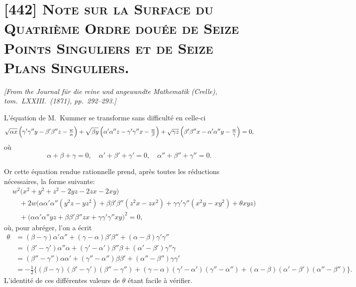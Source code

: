 \documentclass[11pt,a4paper]{article}
\begin{document}
\section{[442] \textsc{Note sur la Surface du Quatri\`eme Ordre dou\'ee de Seize Points Singuliers et de Seize Plans Singuliers.}}

\begin{center}
\textit{[From the Journal f\"ur die reine und angewandte Mathematik (Crelle), tom.\ LXXIII.\ (1871), pp.\ 292--293.]}
\end{center}

\medskip

L'\'equation de M.\ Kummer se transforme sans difficult\'e en celle-ci
\[
\sqrt{\alpha x}\,\Bigl(\gamma'\gamma''y - \beta'\beta''z - \tfrac{w}{\alpha}\Bigr)
+ \sqrt{\beta y}\,\Bigl(\alpha'\alpha''z - \gamma'\gamma''x - \tfrac{w}{\beta}\Bigr)
+ \sqrt{\gamma z}\,\Bigl(\beta'\beta''x - \alpha'\alpha''y - \tfrac{w}{\gamma}\Bigr) = 0,
\]
o\`u
\[
\alpha + \beta + \gamma = 0,\quad \alpha' + \beta' + \gamma' = 0,\quad \alpha'' + \beta'' + \gamma'' = 0.
\]

Or cette \'equation rendue rationnelle prend, apr\`es toutes les r\'eductions n\'ecessaires,
la forme suivante:
\[
\begin{aligned}
& w^2 \bigl(x^2 + y^2 + z^2 - 2yz - 2zx - 2xy\bigr) \\
& \quad + 2w\bigl(\alpha\alpha'\alpha''(y^2 z - y z^2) + \beta\beta'\beta''(z^2 x - z x^2)
   + \gamma\gamma'\gamma''(x^2 y - x y^2) + \theta xyz\bigr) \\
& \quad + \bigl(\alpha\alpha'\alpha''yz + \beta\beta'\beta''zx + \gamma\gamma'\gamma''xy\bigr)^2 = 0,
\end{aligned}
\]
o\`u, pour abr\'eger, l'on a \'ecrit
\[
\begin{aligned}
\theta &= (\beta - \gamma)\alpha'\alpha'' + (\gamma - \alpha)\beta'\beta'' + (\alpha - \beta)\gamma'\gamma'' \\
       &= (\beta' - \gamma')\alpha''\alpha + (\gamma' - \alpha')\beta''\beta + (\alpha' - \beta')\gamma''\gamma \\
       &= (\beta'' - \gamma'')\alpha\alpha' + (\gamma'' - \alpha'')\beta\beta' + (\alpha'' - \beta'')\gamma\gamma' \\
       &= -\tfrac{1}{2}\bigl\{(\beta - \gamma)(\beta' - \gamma')(\beta'' - \gamma'')
                              + (\gamma - \alpha)(\gamma' - \alpha')(\gamma'' - \alpha'')
                              + (\alpha - \beta)(\alpha' - \beta')(\alpha'' - \beta'')\bigr\}.
\end{aligned}
\]
L'identit\'e de ces diff\'erentes valeurs de $\theta$ \'etant facile \`a v\'erifier.
\end{document}

